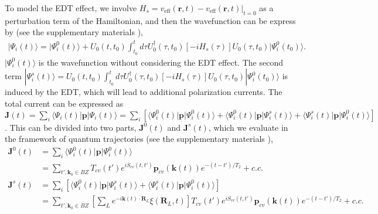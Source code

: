 \documentclass[aps,prl,10pt,preprint,nofootinbib]{revtex4-1}
\begin{document}
To model the EDT effect, we involve $H_{s} = v_{\text{eff}}(\textbf{r},t)-v_{\text{eff}}(\textbf{r},t)\lvert_{t=0}$ as a perturbation term of the Hamiltonian, and then the wavefunction can be express by (see the supplementary materials \cite{SM}),
\begin{align}\label{wavefunction}
|\Psi_{i}(t)\rangle = |\Psi_{i}^{0}(t)\rangle+U_{0}(t,t_{0})\int^{t}_{t_{0}} d\tau U^{\dagger}_{0}(\tau,t_{0})[-iH_{s}(\tau)]U_{0}(\tau,t_{0})|\Psi_{i}^{0}(t_{0})\rangle.
\end{align}
$|\Psi_{i}^{0}(t)\rangle$ is the wavefunction without considering the EDT effect. The second term $|\Psi_{i}^{s}(t)\rangle=U_{0}(t,t_{0})\int^{t}_{t_{0}} d\tau U^{\dagger}_{0}(\tau,t_{0})[-iH_{s}(\tau)]U_{0}(\tau,t_{0})|\Psi_{i}^{0}(t_{0})\rangle$ is induced by the EDT, which will lead to additional polarization currents. The total current can be expressed as $\textbf{J}(t)  = \sum_{i}\langle\Psi_{i}(t)|\textbf{p}|\Psi_{i}(t)\rangle= \sum_{i}\left[\langle\Psi_{i}^{0}(t)|\textbf{p}|\Psi_{i}^{0}(t)\rangle+\langle\Psi_{i}^{0}(t)|\textbf{p}|\Psi_{i}^{s}(t)\rangle+\langle\Psi_{i}^{s}(t)|\textbf{p}|\Psi_{i}^{0}(t)\rangle\right]$. This can be divided into two parts, $\textbf{J}^{0}(t)$ and $\textbf{J}^{s}(t)$, which we evaluate in the framework of quantum trajectories (see the supplementary materials \cite{SM}),
\begin{align}\label{Current}
\textbf{J}^{0}(t) &= \sum_{i}\langle\Psi_{i}^{0}(t)|\textbf{p}|\Psi_{i}^{0}(t)\rangle \nonumber \\ &=\sum_{t',\textbf{k}_{0}\in BZ}T_{cv}(t')e^{iS_{cv}(t,t')}\textbf{p}_{cv}(\textbf{k}(t))e^{-(t-t')/T_{2}}+c.c.   \nonumber \\
\textbf{J}^{s}(t) &= \sum_{i}\left[\langle\Psi_{i}^{0}(t)|\textbf{p}|\Psi_{i}^{s}(t)\rangle+\langle\Psi_{i}^{s}(t)|\textbf{p}|\Psi_{i}^{0}(t)\rangle\right] \nonumber \\ &=\sum_{t',\textbf{k}_{0}\in BZ}\left[\sum_{L}e^{-i\textbf{k}(t)\cdot\textbf{R}_{L}}\xi(\textbf{R}_{L},t)\right]T_{cv}(t')e^{iS_{cv}(t,t')}\textbf{p}_{cv}(\textbf{k}(t))e^{-(t-t')/T_{2}}+c.c.
\end{align}
\end{document}
